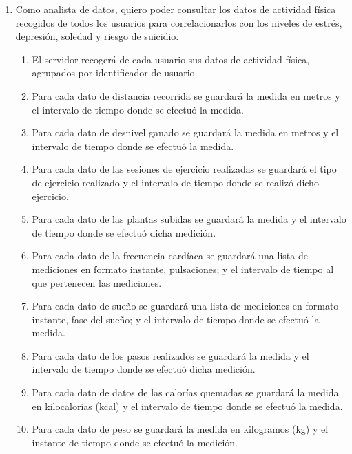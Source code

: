         \begin{enumerate}[resume=req-usuario,label=\textbf{\texttt{RU-\arabic*}}]
            \item \label{req:usuario:analista_actividad_fisica} Como analista de datos, quiero poder consultar los datos de actividad física recogidos de todos los usuarios para correlacionarlos con los niveles de estrés, depresión, soledad y riesgo de suicidio.
            \begin{enumerate}[resume=req-funcionales,label=\textbf{\texttt{RF-\arabic*}}]
                \item \label{req:funcionales:actividad_fisica_recoger} El servidor recogerá de cada usuario sus datos de actividad física, agrupados por identificador de usuario.
                \item \label{req:funcionales:distancia_formato} Para cada dato de distancia recorrida se guardará la medida en metros y el intervalo de tiempo donde se efectuó la medida.
                \item \label{req:funcionales:desnivel_formato} Para cada dato de desnivel ganado se guardará la medida en metros y el intervalo de tiempo donde se efectuó la medida.
                \item \label{req:funcionales:ejercicio_formato} Para cada dato de las sesiones de ejercicio realizadas se guardará el tipo de ejercicio realizado y el intervalo de tiempo donde se realizó dicho ejercicio.
                \item \label{req:funcionales:plantas_formato} Para cada dato de las plantas subidas se guardará la medida y el intervalo de tiempo donde se efectuó dicha medición.
                \item \label{req:funcionales:frecuencia_formato} Para cada dato de la frecuencia cardíaca se guardará una lista de mediciones en formato instante, pulsaciones; y el intervalo de tiempo al que pertenecen las mediciones.
                \item \label{req:funcionales:sueno_formato} Para cada dato de sueño se guardará una lista de mediciones en formato instante, fase del sueño; y el intervalo de tiempo donde se efectuó la medida.
                \item \label{req:funcionales:pasos_formato} Para cada dato de los pasos realizados se guardará la medida y el intervalo de tiempo donde se efectuó dicha medición.
                \item \label{req:funcionales:calorias_formato} Para cada dato de datos de las calorías quemadas se guardará la medida en kilocalorías (kcal) y el intervalo de tiempo donde se efectuó la medida.
                \item \label{req:funcionales:peso_formato} Para cada dato de peso se guardará la medida en kilogramos (kg) y el instante de tiempo donde se efectuó la medición.
            \end{enumerate}
        \end{enumerate}
        
